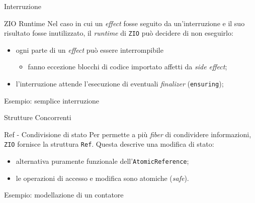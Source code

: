\begin{frame}{Interruzione}
  \begin{block}{ZIO Runtime}
    Nel caso in cui un \textit{effect} fosse seguito da un'interruzione e il suo risultato fosse inutilizzato, il \textit{runtime} di \texttt{ZIO} può decidere di non eseguirlo:
    \begin{itemize}
      \item ogni parte di un \textit{effect} può essere interrompibile
      \begin{itemize}
        \item fanno eccezione blocchi di codice importato affetti da \textit{side effect};
      \end{itemize}
      \item l'interruzione attende l'esecuzione di eventuali \textit{finalizer} (\texttt{ensuring});
    \end{itemize}
  \end{block}
  \begin{block}{Esempio: semplice interruzione}
        
  \end{block}
\end{frame}

\begin{frame}{Strutture Concorrenti}
  \begin{block}{Ref - Condivisione di stato}
    Per permette a più \textit{fiber} di condividere informazioni, \texttt{ZIO} fornisce la struttura \texttt{Ref}. Questa descrive una modifica di stato:
    \begin{itemize}
      \item alternativa puramente funzionale dell'\texttt{AtomicReference};
      \item le operazioni di accesso e modifica sono atomiche (\textit{safe}).
    \end{itemize}
  \end{block}
  \begin{block}{Esempio: modellazione di un contatore}
        
  \end{block}
\end{frame}

